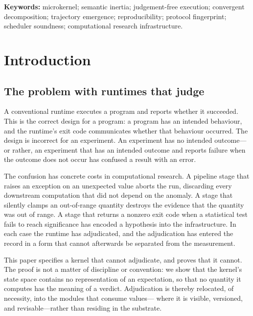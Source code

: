 \documentclass[11pt,a4paper]{article}
\theoremstyle{thmstyle}
\theoremstyle{definition}
\theoremstyle{remark}
\begin{document}
\noindent\textbf{Keywords:} microkernel; semantic inertia; judgement-free
execution; convergent decomposition; trajectory emergence; reproducibility;
protocol fingerprint; scheduler soundness; computational research
infrastructure.

\tableofcontents

\section{Introduction}
\label{sec:intro}

\subsection{The problem with runtimes that judge}

A conventional runtime executes a program and reports whether it succeeded.
This is the correct design for a program: a program has an intended
behaviour, and the runtime's exit code communicates whether that behaviour
occurred. The design is incorrect for an experiment. An experiment has no
intended outcome---or rather, an experiment that has an intended outcome and
reports failure when the outcome does not occur has confused a result with
an error.

The confusion has concrete costs in computational research. A pipeline stage
that raises an exception on an unexpected value aborts the run, discarding
every downstream computation that did not depend on the anomaly. A stage
that silently clamps an out-of-range quantity destroys the evidence that the
quantity was out of range. A stage that returns a nonzero exit code when a
statistical test fails to reach significance has encoded a hypothesis into
the infrastructure. In each case the runtime has adjudicated, and the
adjudication has entered the record in a form that cannot afterwards be
separated from the measurement.

This paper specifies a kernel that cannot adjudicate, and proves that it
cannot. The proof is not a matter of discipline or convention: we show that
the kernel's state space contains no representation of an expectation, so
that no quantity it computes has the meaning of a verdict. Adjudication is
thereby relocated, of necessity, into the modules that consume values---
where it is visible, versioned, and revisable---rather than residing in the
substrate.
\end{document}
